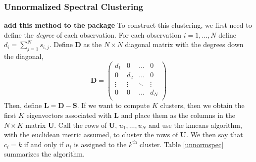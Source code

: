 \documentclass[11pt,letterpaper]{article}
\numberwithin{equation}{section}
\begin{document}
\subsubsection{Unnormalized Spectral Clustering}
\textbf{add this method to the package} To construct this
clustering, we first need to define the \emph{degree} of each
observation.  For each observation $i=1,\hdots, N$ define $d_i =
\sum_{j=1}^{N} s_{i,j}$.  Define $\boldsymbol{D}$ as the $N \times
N$ diagonal matrix with the degrees down the diagonal,
\begin{equation}
\boldsymbol{D} = \begin{pmatrix}
d_1 & 0 & \hdots & 0 \\
0   & d_2 & \hdots & 0 \\
\vdots   &  \vdots  & \ddots & \vdots \\
0       &     0     &   \hdots & d_N \\
\end{pmatrix} \nonumber
\end{equation}
Then, define $\boldsymbol{L} = \boldsymbol{D} - \boldsymbol{S}$.  If
we want to compute $K$ clusters, then we obtain the first $K$
eigenvectors associated with $\boldsymbol{L}$ and place them as the
columns in the $N \times K$ matrix $\boldsymbol{U}$.  Call the rows
of $\boldsymbol{U}$, $u_1, \hdots, u_N$ and use the kmeans
algorithm, with the euclidean metric assumed, to cluster the rows of
$\boldsymbol{U}$.  We then say that $c_i = k $ if and only if $u_i$
is assigned to the $k^{\text{th}}$ cluster.  Table \ref{unnormspec}
summarizes the algorithm.
\begin{table}[hbt!]
\caption{Unnormalized Spectral Clustering} \label{unnormspec}
\end{table}
\end{document}
